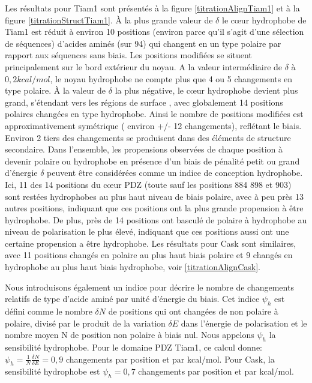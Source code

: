 Les résultats pour Tiam1 sont présentés à la figure \ref{titrationAlignTiam1} et à la figure \ref{titrationStructTiam1}. À la plus grande valeur de $\delta$ le cœur hydrophobe de Tiam1 est réduit à environ 10 positions (environ parce qu'il s'agit d'une sélection de séquences) d'acides aminés (sur 94) qui changent en  un type polaire par rapport aux séquences sans biais. Les positions modifiées se situent principalement sur le bord extérieur du noyau. A la valeur intermédiaire de $\delta$ à $0,2 kcal/mol$, le noyau hydrophobe ne compte plus que 4 ou 5 changements en type polaire. À la valeur de $\delta$ la plus négative, le cœur hydrophobe devient plus grand, s'étendant vers les régions de surface , avec globalement 14 positions polaires changées en type hydrophobe. Ainsi le nombre de positions modifiées est approximativement symétrique ( environ +/- 12 changements), reflétant le biais. Environ 2 tiers des changements se produisent dans des éléments de structure secondaire. Dans l'ensemble, les propensions observées de chaque position à devenir polaire ou hydrophobe en présence d'un biais de pénalité petit ou grand d'énergie $\delta$ peuvent être considérées comme un indice de conception hydrophobe. Ici, 11 des 14 positions du cœur PDZ (toute sauf les positions 884 898 et 903) sont restées hydrophobes au plus haut niveau de biais polaire, avec à peu près 13 autres positions, indiquant que ces positions ont la plus grande propension à être hydrophobe. De plus, près de 14 positions ont basculé de polaire à hydrophobe au niveau de polarisation le plus élevé, indiquant que ces positions aussi ont une certaine propension a être hydrophobe. Les résultats pour Cask sont similaires, avec 11 positions changés en polaire au plus haut biais polaire et 9 changés en hydrophobe au plus haut biais hydrophobe, voir \ref{titrationAlignCask}.

Nous introduisons également un indice pour décrire le nombre de changements relatifs de type d'acide aminé par unité d'énergie du biais. Cet indice  $\psi_h$ est défini comme le nombre $\delta N$ de positions qui ont changées de non polaire à polaire, divisé par le produit de la variation $\delta E$ dans l'énergie de polarisation et le nombre moyen N de position non polaire à biais nul. Nous appelons $\psi_h$ la sensibilité hydrophobe. Pour le domaine PDZ Tiam1, ce calcul donne:
$\psi_h = \frac{1}{N} \frac{\delta N}{\delta E} = 0,9$ changements par position et par kcal/mol. Pour Cask, la sensibilité hydrophobe  est  $\psi_h = 0,7$ changements par position et par kcal/mol.


